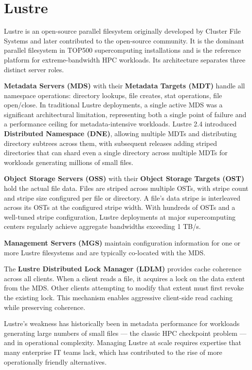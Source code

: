 \section{Lustre}
Lustre is an open-source parallel filesystem originally developed by Cluster File Systems and later contributed to the open-source community. It is the dominant parallel filesystem in TOP500 supercomputing installations and is the reference platform for extreme-bandwidth HPC workloads. Its architecture separates three distinct server roles.

\textbf{Metadata Servers (MDS)} with their \textbf{Metadata Targets (MDT)} handle all namespace operations: directory lookups, file creates, stat operations, file open/close. In traditional Lustre deployments, a single active MDS was a significant architectural limitation, representing both a single point of failure and a performance ceiling for metadata-intensive workloads. Lustre 2.4 introduced \textbf{Distributed Namespace (DNE)}, allowing multiple MDTs and distributing directory subtrees across them, with subsequent releases adding striped directories that can shard even a single directory across multiple MDTs for workloads generating millions of small files.

\textbf{Object Storage Servers (OSS)} with their \textbf{Object Storage Targets (OST)} hold the actual file data. Files are striped across multiple OSTs, with stripe count and stripe size configured per file or directory. A file's data stripe is interleaved across its OSTs at the configured stripe width. With hundreds of OSTs and a well-tuned stripe configuration, Lustre deployments at major supercomputing centers regularly achieve aggregate bandwidths exceeding 1 TB/s.

\textbf{Management Servers (MGS)} maintain configuration information for one or more Lustre filesystems and are typically co-located with the MDS.

The \textbf{Lustre Distributed Lock Manager (LDLM)} provides cache coherence across all clients. When a client reads a file, it acquires a lock on the data extent from the MDS. Other clients attempting to modify that extent must first revoke the existing lock. This mechanism enables aggressive client-side read caching while preserving coherence.

Lustre's weakness has historically been in metadata performance for workloads generating large numbers of small files --- the classic HPC checkpoint problem --- and in operational complexity. Managing Lustre at scale requires expertise that many enterprise IT teams lack, which has contributed to the rise of more operationally friendly alternatives.

